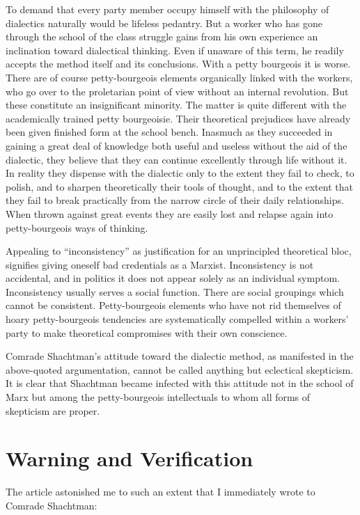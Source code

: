To demand that every party member occupy himself with the philosophy of dialectics naturally would be lifeless pedantry. But a worker who has gone through the school of the class struggle gains from his own experience an inclination toward dialectical thinking. Even if unaware of this term, he readily accepts the method itself and its conclusions. With a petty bourgeois it is worse. There are of course petty-bourgeois elements organically linked with the workers, who go over to the proletarian point of view without an internal revolution. But these constitute an insignificant minority. The matter is quite different with the academically trained petty bourgeoisie. Their theoretical prejudices have already been given finished form at the school bench. Inasmuch as they succeeded in gaining a great deal of knowledge both useful and useless without the aid of the dialectic, they believe that they can continue excellently through life without it. In reality they dispense with the dialectic only to the extent they fail to check, to polish, and to sharpen theoretically their tools of thought, and to the extent that they fail to break practically from the narrow circle of their daily relationships. When thrown against great events they are easily lost and relapse again into petty-bourgeois ways of thinking.

Appealing to “inconsistency” as justification for an unprincipled theoretical bloc, signifies giving oneself bad credentials as a Marxist. Inconsistency is not accidental, and in politics it does not appear solely as an individual symptom. Inconsistency usually serves a social function. There are social groupings which cannot be consistent. Petty-bourgeois elements who have not rid themselves of hoary petty-bourgeois tendencies are systematically compelled within a workers’ party to make theoretical compromises with their own conscience.

Comrade Shachtman’s attitude toward the dialectic method, as manifested in the above-quoted argumentation, cannot be called anything but eclectical skepticism. It is clear that Shachtman became infected with this attitude not in the school of Marx but among the petty-bourgeois intellectuals to whom all forms of skepticism are proper.

\section*{Warning and Verification}

The article astonished me to such an extent that I immediately wrote to Comrade Shachtman:

